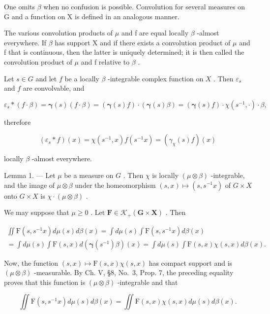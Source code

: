 One omits \(\beta\) when no confusion is possible. Convolution for several measures on G and a function on X is defined in an analogous manner.

The various convolution products of \(\mu\) and f are equal locally \(\beta\) -almost everywhere. If \(\beta\) has support X and if there exists a convolution product of \(\mu\) and f that is continuous, then the latter is uniquely determined; it is then called the convolution product of \(\mu\) and f relative to \(\beta\) .

Let \(s \in G\) and let \(f\) be a locally \(\beta\) -integrable complex function on \(X\) . Then \(\varepsilon_s\) and \(f\) are convolvable, and

\[
\varepsilon_ {s} * (f \cdot \beta) = \boldsymbol {\gamma} (s) (f \cdot \beta) = (\boldsymbol {\gamma} (s) f) \cdot (\boldsymbol {\gamma} (s) \beta) = (\boldsymbol {\gamma} (s) f) \cdot \chi (s ^ {- 1}, \cdot) \cdot \beta ,
\]

therefore

\[
\left(\varepsilon_ {s} * f\right) (x) = \chi \left(s ^ {- 1}, x\right) f \left(s ^ {- 1} x\right) = \left(\gamma_ {\chi} (s) f\right) (x)\tag{2}
\]

locally \(\beta\) -almost everywhere.

Lemma 1. --- Let \(\mu\) be a measure on \(G\) . Then \(\chi\) is locally \((\mu \otimes \beta)\) -integrable, and the image of \(\mu \otimes \beta\) under the homeomorphism \((s, x) \mapsto (s, s^{-1}x)\) of \(G \times X\) onto \(G \times X\) is \(\chi \cdot (\mu \otimes \beta)\) .

We may suppose that \(\mu \geqslant 0\) . Let \(\mathbf{F} \in \mathcal{K}_{+}(\mathbf{G} \times \mathbf{X})\) . Then

\[
\begin{array}{l} \iint \mathrm{F} (s, s ^ {- 1} x) d \mu (s) d \beta (x) = \int d \mu (s) \int \mathrm{F} (s, s ^ {- 1} x) d \beta (x) \\ = \int d \mu (s) \int \mathrm{F} (s, x) d (\boldsymbol {\gamma} (s ^ {- 1}) \beta) (x) = \int d \mu (s) \int \mathrm{F} (s, x) \chi (s, x) d \beta (x). \end{array}
\]

Now, the function \((s,x)\mapsto\mathrm{F}(s,x)\chi(s,x)\) has compact support and is \((\mu\otimes\beta)\) -measurable. By Ch. V, §8, No.~3, Prop. 7, the preceding equality proves that this function is \((\mu\otimes\beta)\) -integrable and that

\[
\iint \mathrm{F} (s, s ^ {- 1} x) d \mu (s) d \beta (x) = \iint \mathrm{F} (s, x) \chi (s, x) d \mu (s) d \beta (x).
\]

